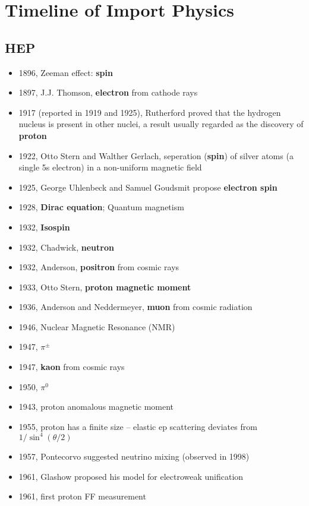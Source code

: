 \chapter{Timeline of Import Physics}

\section{HEP}
\begin{itemize}
    \item 1896, Zeeman effect: \textbf{spin}
    \item 1897, J.J. Thomson, \textbf{electron} from cathode rays
    \item 1917 (reported in 1919 and 1925), Rutherford proved that the hydrogen 
	nucleus is present in other nuclei, a result usually regarded as the discovery
	of \textbf{proton}
    \item 1922, Otto Stern and Walther Gerlach, seperation (\textbf{spin}) of silver atoms 
	(a single 5s electron) in a non-uniform magnetic field
    \item 1925, George Uhlenbeck and Samuel Goudsmit propose \textbf{electron spin} 
    \item 1928, \textbf{Dirac equation}; Quantum magnetism
    \item 1932, \textbf{Isospin}
    \item 1932, Chadwick, \textbf{neutron}
    \item 1932, Anderson, \textbf{positron} from cosmic rays
    \item 1933, Otto Stern, \textbf{proton magnetic moment}
    \item 1936, Anderson and Neddermeyer, \textbf{muon} from cosmic radiation
    \item 1946, Nuclear Magnetic Resonance (NMR)
    \item 1947, $\pi^\pm$
    \item 1947, \textbf{kaon} from cosmic rays
    \item 1950, $\pi^0$
    \item 1943, proton anomalous magnetic moment
    \item 1955, proton has a finite size \cite{PhysRev.98.217} -- elastic ep 
	scattering deviates from $1/\sin^4(\theta/2)$
    \item 1957, Pontecorvo suggested neutrino mixing (observed in 1998)
    \item 1961, Glashow proposed his model for electroweak unification
    \item 1961, first proton FF measurement

\end{itemize}
